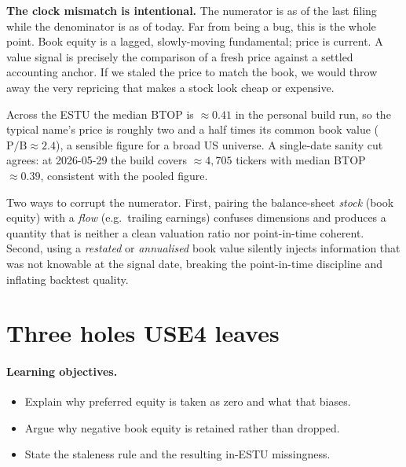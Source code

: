 \documentclass[11pt]{article}
\theoremstyle{definition}
\theoremstyle{plain}
\theoremstyle{remark}
\begin{document}
\textbf{The clock mismatch is intentional.} The numerator is as of the last filing while the denominator is as of today. Far from being a bug, this is the whole point. Book equity is a lagged, slowly-moving fundamental; price is current. A value signal is precisely the comparison of a fresh price against a settled accounting anchor. If we staled the price to match the book, we would throw away the very repricing that makes a stock look cheap or expensive.

\begin{observed}
Across the ESTU the median BTOP is $\approx 0.41$ in the personal build run, so the typical name's price is roughly two and a half times its common book value ($\text{P/B}\approx 2.4$), a sensible figure for a broad US universe. A single-date sanity cut agrees: at 2026-05-29 the build covers $\approx 4{,}705$ tickers with median BTOP $\approx 0.39$, consistent with the pooled figure.
\end{observed}

\begin{pitfall}
Two ways to corrupt the numerator. First, pairing the balance-sheet \emph{stock} (book equity) with a \emph{flow} (e.g.\ trailing earnings) confuses dimensions and produces a quantity that is neither a clean valuation ratio nor point-in-time coherent. Second, using a \emph{restated} or \emph{annualised} book value silently injects information that was not knowable at the signal date, breaking the point-in-time discipline and inflating backtest quality.
\end{pitfall}

\section{Three holes USE4 leaves}\label{sec:holes}

\paragraph{Learning objectives.}
\begin{itemize}[leftmargin=1.4em,nosep]
  \item Explain why preferred equity is taken as zero and what that biases.
  \item Argue why negative book equity is retained rather than dropped.
  \item State the staleness rule and the resulting in-ESTU missingness.
\end{itemize}
\end{document}

